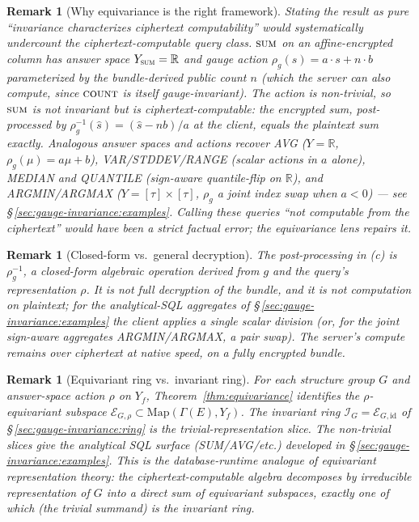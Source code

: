 \documentclass[11pt,letterpaper]{article}
\newtheorem{remark}[theorem]{Remark}
\begin{document}
\begin{remark}[Why equivariance is the right framework]
Stating the result as pure ``invariance characterizes ciphertext
computability'' would systematically undercount the
ciphertext-computable query class. $\textsc{sum}$ on an
affine-encrypted column has answer space
$Y_{\textsc{sum}} = \mathbb{R}$ and gauge action
$\rho_g(s) = a \cdot s + n \cdot b$ parameterized by the
bundle-derived public count $n$ (which the server can also
compute, since $\textsc{count}$ is itself gauge-invariant). The
action is non-trivial, so $\textsc{sum}$ is \emph{not} invariant
but \emph{is} ciphertext-computable: the encrypted sum,
post-processed by $\rho_g^{-1}(\hat s) = (\hat s - n b)/a$ at the
client, equals the plaintext sum exactly. Analogous answer
spaces and actions recover AVG ($Y = \mathbb{R}$,
$\rho_g(\mu) = a\mu + b$), VAR/STDDEV/RANGE (scalar actions in
$a$ alone), MEDIAN and QUANTILE (sign-aware quantile-flip on
$\mathbb{R}$), and ARGMIN/ARGMAX
($Y = [\tau] \times [\tau]$, $\rho_g$ a joint index swap when
$a < 0$) --- see \S\,\ref{sec:gauge-invariance:examples}.
Calling these queries ``not computable from the ciphertext''
would have been a strict factual error; the equivariance lens
repairs it.
\end{remark}

\begin{remark}[Closed-form vs.\ general decryption]
The post-processing in (c) is $\rho_g^{-1}$, a closed-form
algebraic operation derived from $g$ and the query's
representation $\rho$. It is \emph{not} full decryption of the
bundle, and it is \emph{not} computation on plaintext; for the
analytical-SQL aggregates of \S\,\ref{sec:gauge-invariance:examples}
the client applies a single scalar division (or, for the joint
sign-aware aggregates ARGMIN/ARGMAX, a pair swap). The server's
compute remains over ciphertext at native speed, on a fully
encrypted bundle.
\end{remark}

\begin{remark}[Equivariant ring vs.\ invariant ring]
For each structure group $G$ and answer-space action $\rho$ on
$Y_f$, Theorem~\ref{thm:equivariance} identifies the
\emph{$\rho$-equivariant subspace}
$\mathcal{E}_{G,\rho} \subset \mathrm{Map}(\Gamma(E), Y_f)$. The
invariant ring $\mathcal{I}_G = \mathcal{E}_{G,\mathrm{id}}$ of
\S\,\ref{sec:gauge-invariance:ring} is the trivial-representation
slice. The non-trivial slices give the analytical SQL surface
(SUM/AVG/etc.) developed in \S\,\ref{sec:gauge-invariance:examples}.
This is the database-runtime analogue of equivariant
representation theory: the ciphertext-computable algebra
\emph{decomposes by irreducible representation of $G$} into a
direct sum of equivariant subspaces, exactly one of which
(the trivial summand) is the invariant ring.
\end{remark}
\end{document}
